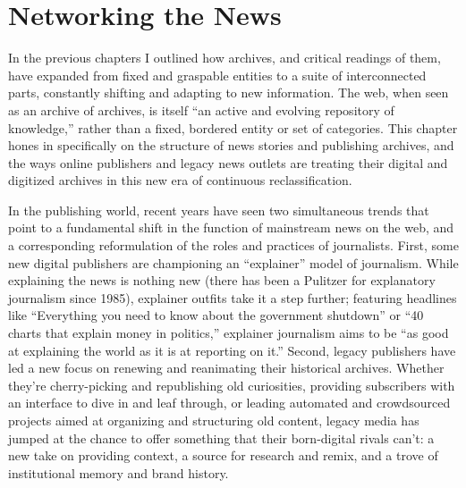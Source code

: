 \chapter{Networking the News}

In the previous chapters I outlined how archives, and critical readings of them, have expanded from fixed and graspable entities to a suite of interconnected parts, constantly shifting and adapting to new information. The web, when seen as an archive of archives, is itself ``an active and evolving repository of knowledge,'' rather than a fixed, bordered entity or set of categories.\autocite[2]{chakrabarti_mining_2003} This chapter hones in specifically on the structure of news stories and publishing archives, and the ways online publishers and legacy news outlets are treating their digital and digitized archives in this new era of continuous reclassification.


In the publishing world, recent years have seen two simultaneous trends that point to a fundamental shift in the function of mainstream news on the web, and a corresponding reformulation of the roles and practices of journalists. First, some new digital publishers are championing an ``explainer'' model of journalism. While explaining the news is nothing new (there has been a Pulitzer for explanatory journalism since 1985), explainer outfits take it a step further; featuring headlines like ``Everything you need to know about the government shutdown'' or ``40 charts that explain money in politics,'' explainer journalism aims to be ``as good at explaining the world as it is at reporting on it.''\autocite{klein_vox_2014} Second, legacy publishers have led a new focus on renewing and reanimating their historical archives. Whether they're cherry-picking and republishing old curiosities, providing subscribers with an interface to dive in and leaf through, or leading automated and crowdsourced projects aimed at organizing and structuring old content, legacy media has jumped at the chance to offer something that their born-digital rivals can't: a new take on providing context, a source for research and remix, and a trove of institutional memory and brand history.


